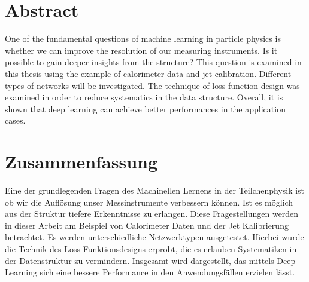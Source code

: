 

\chapter*{Abstract}

One of the fundamental questions of machine learning in particle
physics is whether we can improve the resolution of our measuring
instruments. Is it possible to gain deeper insights from the
structure? This question is examined in this thesis using the example
of calorimeter data and jet calibration. Different types of networks
will be investigated. The technique of loss function design was
examined in order to reduce systematics in the data
structure. Overall, it is shown that deep learning can achieve better
performances in the application cases.

\chapter*{Zusammenfassung}
Eine der grundlegenden Fragen des Machinellen Lernens in der
Teilchenphysik ist ob wir die Auflösung unser Messinstrumente
verbessern können. Ist es möglich aus der Struktur tiefere
Erkenntnisse zu erlangen. Diese Fragestellungen werden in dieser
Arbeit am Beispiel von Calorimeter Daten und der Jet Kalibrierung
betrachtet. Es werden unterschiedliche Netzwerktypen
ausgetestet. Hierbei wurde die Technik des Loss Funktionsdesigns
erprobt, die es erlauben Systematiken in der Datenstruktur zu
vermindern. Insgesamt wird dargestellt, das mittels Deep Learning sich
eine bessere Performance in den Anwendungsfällen erzielen lässt.

